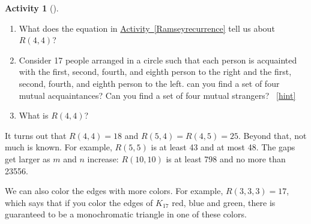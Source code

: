 \documentclass[10pt,]{book}
\theoremstyle{plain}
\theoremstyle{definition}
\theoremstyle{definition}
\theoremstyle{definition}
\newtheorem{activity}[project]{Activity}
\numberwithin{equation}{chapter}
\begin{document}
\begin{activity}[]\label{Ramseybound2}
\leavevmode%
\begin{enumerate}[font=\bfseries,label=(\alph*),ref=\alph*]
\item\label{task-281} \hypertarget{p-1683}{}%
What does the equation in \hyperref[Ramseyrecurrence]{Activity~\ref{Ramseyrecurrence}} tell us about \(R(4,4)\)?%
\item\label{task-282} \hypertarget{p-1685}{}%
Consider 17 people arranged in a circle such that each person is acquainted with the first, second, fourth, and eighth person to the right and the first, second, fourth, and eighth person to the left.  can you find a set of four mutual acquaintances?  Can you find a set of four mutual strangers?%
~\hfill{\tiny\hyperlink{a-318.b}{[hint]}\hypertarget{q-318.b}{}}\item\label{task-283} \hypertarget{p-1688}{}%
What is \(R(4,4)\)?%
\end{enumerate}
\end{activity}
\hypertarget{p-1689}{}%
It turns out that \(R(4,4) = 18\) and \(R(5, 4) = R(4,5) = 25\).  Beyond that, not much is known.  For example, \(R(5,5)\) is at least 43 and at most 48.  The gaps get larger as \(m\) and \(n\) increase: \(R(10,10)\) is at least 798 and no more than 23556.%
\par
\hypertarget{p-1690}{}%
We can also color the edges with more colors.  For example, \(R(3,3,3) = 17\), which says that if you color the edges of \(K_{17}\) red, blue and green, there is guaranteed to be a monochromatic triangle in one of these colors.%
\typeout{************************************************}
\typeout{************************************************}
\end{document}
